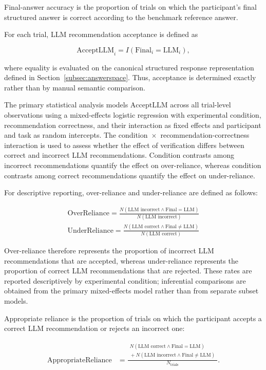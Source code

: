 \documentclass[oneside,final,14pt,a4paper]{extreport}
\begin{document}
Final-answer accuracy is the proportion of trials on which the participant's
final structured answer is correct according to the benchmark reference
answer.

For each trial, LLM recommendation acceptance is defined as

$$
\text{AcceptLLM}_i =
I(\text{Final}_i=\text{LLM}_i),
$$

where equality is evaluated on the canonical structured response
representation defined in Section~\ref{subsec:answerspace}. Thus, acceptance
is determined exactly rather than by manual semantic comparison.

The primary statistical analysis models $\text{AcceptLLM}$ across all
trial-level observations using a mixed-effects logistic regression with
experimental condition, recommendation correctness, and their interaction as
fixed effects and participant and task as random intercepts. The
condition~$\times$~recommendation-correctness interaction is used to assess
whether the effect of verification differs between correct and incorrect LLM
recommendations. Condition contrasts among incorrect recommendations quantify
the effect on over-reliance, whereas condition contrasts among correct
recommendations quantify the effect on under-reliance.

For descriptive reporting, over-reliance and under-reliance are defined as
follows:

$$
\begin{array}{c}
\displaystyle
\text{OverReliance}
=
\frac{
N(\text{LLM incorrect}\land\text{Final}=\text{LLM})
}{
N(\text{LLM incorrect})
}
\\[1.5em]
\displaystyle
\text{UnderReliance}
=
\frac{
N(\text{LLM correct}\land\text{Final}\neq\text{LLM})
}{
N(\text{LLM correct})
}
\end{array}
$$

Over-reliance therefore represents the proportion of incorrect LLM
recommendations that are accepted, whereas under-reliance represents the
proportion of correct LLM recommendations that are rejected. These rates are
reported descriptively by experimental condition; inferential comparisons are
obtained from the primary mixed-effects model rather than from separate
subset models.

Appropriate reliance is the proportion of trials on which the participant
accepts a correct LLM recommendation or rejects an incorrect one:

$$
\begin{aligned}
\text{AppropriateReliance}
&=
\frac{
\begin{gathered}
N(\text{LLM correct}\land\text{Final}=\text{LLM})\\
{}+N(\text{LLM incorrect}\land\text{Final}\neq\text{LLM})
\end{gathered}
}{
N_{\text{trials}}
}.
\end{aligned}
$$
\end{document}
